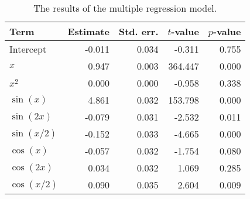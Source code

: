 \begin{table}[!h]

\caption{\label{tab:multiple-regression}The results of the multiple regression model.}
\centering
\begin{tabular}{lrrrr}
\toprule
Term & Estimate & Std. err. & \(t\)-value & \(p\)-value\\
\midrule
Intercept & -0.011 & 0.034 & -0.311 & 0.755\\
\(x\) & 0.947 & 0.003 & 364.447 & 0.000\\
\(x^2\) & 0.000 & 0.000 & -0.958 & 0.338\\
\(\sin(x)\) & 4.861 & 0.032 & 153.798 & 0.000\\
\(\sin(2x)\) & -0.079 & 0.031 & -2.532 & 0.011\\
\(\sin(x/2)\) & -0.152 & 0.033 & -4.665 & 0.000\\
\(\cos(x)\) & -0.057 & 0.032 & -1.754 & 0.080\\
\(\cos(2x)\) & 0.034 & 0.032 & 1.069 & 0.285\\
\(\cos(x/2)\) & 0.090 & 0.035 & 2.604 & 0.009\\
\bottomrule
\end{tabular}
\end{table}